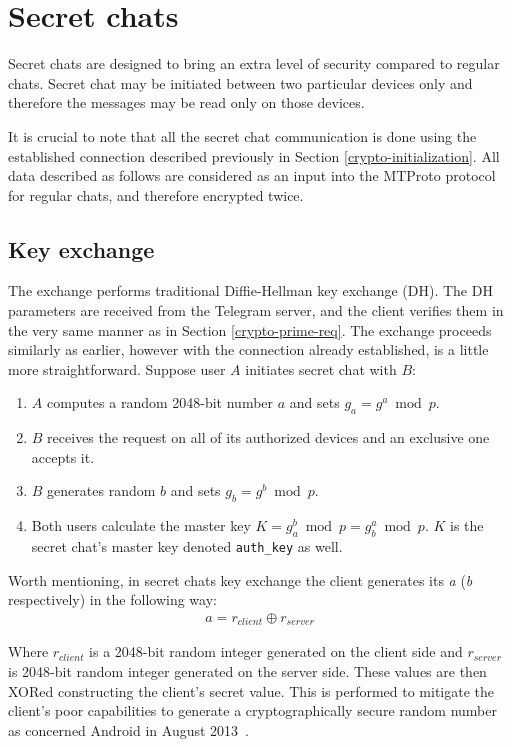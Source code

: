 \documentclass[thesis=M,english]{FITthesis}[2012/10/20]
\begin{document}
\section{Secret chats}\label{crypto-secret}

Secret chats are designed to bring an extra level of security compared to regular chats. Secret chat may be initiated between two particular devices only and therefore the messages may be read only on those devices.

It is crucial to note that all the secret chat communication is done using the established connection described previously in Section \ref{crypto-initialization}. All data described as follows are considered as an input into the MTProto protocol for regular chats, and therefore encrypted twice.

\subsection{Key exchange}\label{crypto-keyexchange}

The exchange performs traditional Diffie-Hellman key exchange (DH). The DH parameters are received from the Telegram server, and the client verifies them in the very same manner as in Section \ref{crypto-prime-req}. The exchange proceeds similarly as earlier, however with the connection already established, is a little more straightforward. Suppose user $A$ initiates secret chat with $B$:

\begin{enumerate}
	\item $A$ computes a random 2048-bit number $a$ and sets $g_a = g^a \bmod p$.\label{enum:DH-a}
	\item $B$ receives the request on all of its authorized devices and an exclusive one accepts it.
	\item $B$ generates random $b$ and sets $g_b = g^b \bmod p$\label{enum:DH-b}.
	\item Both users calculate the master key $K = g_a^b \bmod p = g_b^a \bmod p$. $K$ is the secret chat's master key denoted \texttt{auth\_key} as well.
\end{enumerate}

Worth mentioning, in secret chats key exchange the client generates its \emph{a} (\emph{b} respectively) in the following way:
\begin{gather*}
a = r_{client} \oplus r_{server}
\end{gather*}

Where $r_{client}$ is a 2048-bit random integer generated on the client side and $r_{server}$ is 2048-bit random integer generated on the server side. These values are then XORed constructing the client's secret value. This is performed to mitigate the client's poor capabilities to generate a cryptographically secure random number as concerned Android in August 2013~\cite{telegram-android-securerandom}.
\end{document}
